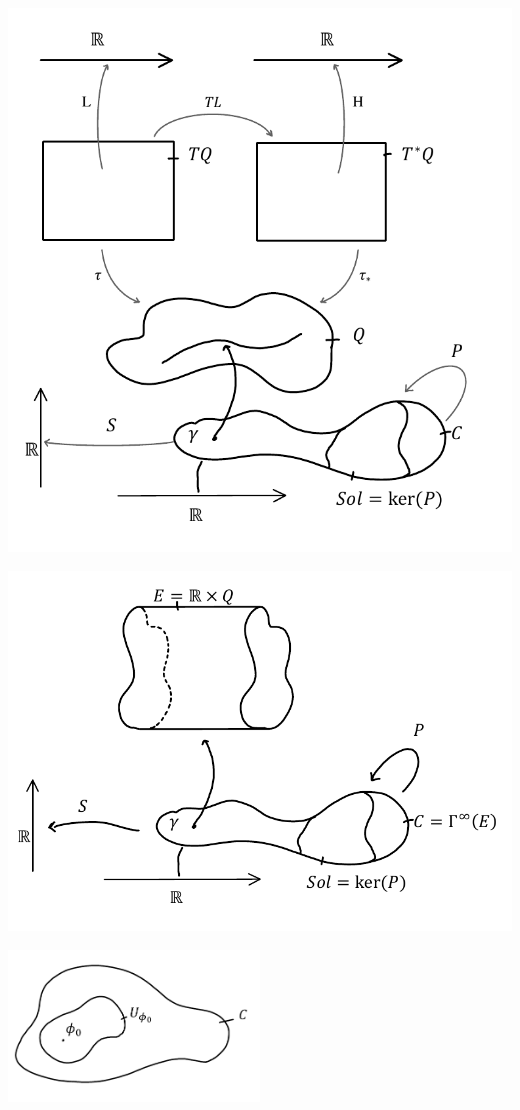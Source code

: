 \documentclass[Main]{subfiles}
\begin{document}
	\includegraphics[width=\textwidth]{Pictures/GeoMecFrame} 

	\includegraphics[width=\textwidth]{Pictures/FieMecFrame} 

	\includegraphics[width=0.5\textwidth]{Pictures/Linearization} 
\end{document}
